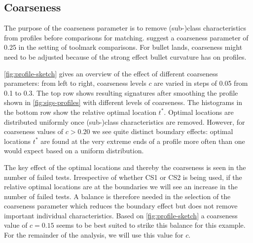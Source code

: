 \documentclass[12pt]{article}
\begin{document}
\subsection{Coarseness}\label{coarseness}

The purpose of the coarseness parameter is to remove (sub-)class
characteristics from profiles before comparisons for matching.
\citet{hadler} suggest a coarseness parameter of 0.25 in the setting of
toolmark comparisons. For bullet lands, coarseness might need to be
adjusted because of the strong effect bullet curvature has on profiles.

\autoref{fig:profile-sketch} gives an overview of the effect of
different coarseness parameters: from left to right, coarseness levels
\(c\) are varied in steps of 0.05 from 0.1 to 0.3. The top row shows
resulting signatures after smoothing the profile shown in
\autoref{fig:sigs-profiles} with different levels of coarseness. The
histograms in the bottom row show the relative optimal location \(t^*\).
Optimal locations are distributed uniformly once (sub-)class
characteristics are removed. However, for coarseness values of
\(c > 0.20\) we see quite distinct boundary effects: optimal locations
\(t^*\) are found at the very extreme ends of a profile more often than
one would expect based on a uniform distribution.

The key effect of the optimal locations and thereby the coarseness is
seen in the number of failed tests. Irrespective of whether CS1 or CS2
is being used, if the relative optimal locations are at the boundaries
we will see an increase in the number of failed tests. A balance is
therefore needed in the selection of the coarseness parameter which
reduces the boundary effect but does not remove important individual
characteristics. Based on \autoref{fig:profile-sketch} a coarseness
value of \(c = 0.15\) seems to be best suited to strike this balance for
this example. For the remainder of the analysis, we will use this value
for \(c\).
\end{document}
